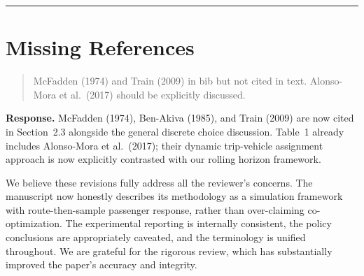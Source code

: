 \documentclass[12pt]{article}
\newenvironment{revcomment}{%
  \begin{quote}\itshape
}{%
  \end{quote}
}
\begin{document}
\bigskip\hrule\bigskip

\section*{Missing References}

\begin{revcomment}
McFadden (1974) and Train (2009) in bib but not cited in text. Alonso-Mora et al.\ (2017) should be explicitly discussed.
\end{revcomment}

\textbf{Response.} McFadden (1974), Ben-Akiva (1985), and Train (2009) are now cited in Section~2.3 alongside the general discrete choice discussion. Table~1 already includes Alonso-Mora et al.\ (2017); their dynamic trip-vehicle assignment approach is now explicitly contrasted with our rolling horizon framework.

\bigskip

We believe these revisions fully address all the reviewer's concerns. The manuscript now honestly describes its methodology as a simulation framework with route-then-sample passenger response, rather than over-claiming co-optimization. The experimental reporting is internally consistent, the policy conclusions are appropriately caveated, and the terminology is unified throughout. We are grateful for the rigorous review, which has substantially improved the paper's accuracy and integrity.
\end{document}
